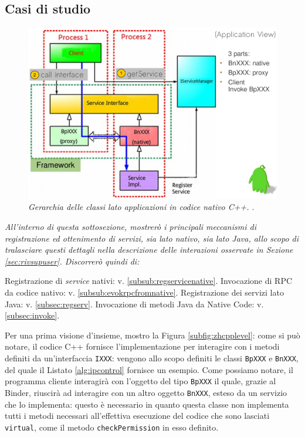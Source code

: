 \subsection{Casi di studio}
\begin{figure}[thp]
\centering
\includegraphics[scale=0.43]{img/korea/cpplevel.png}
\caption{\textit{Gerarchia delle classi lato applicazioni in codice nativo C++. \parencite{slide:zhIPC}}.}
\label{subfig:zhcpplevel}
\end{figure}

\textit{All'interno di questa sottosezione, mostrerò i principali meccanismi di
registrazione ed ottenimento di servizi, sia lato nativo, sia lato Java, allo 
scopo di tralasciare questi dettagli nella descrizione delle interazioni
osservate in Sezione \vref{sec:rivsupuser}. Discorrerò quindi di:}
\begin{itemize}
\diam Registrazione di \textit{service} nativi: v. \vref{subsub:regservicenative}.
\diam Invocazione di RPC da codice nativo: v. \vref{subsub:evokrpcfromnative}.
\diam Registrazione dei servizi lato Java: v. \vref{subsec:regserv}.
\diam Invocazione di metodi Java da Native Code: v. \vref{subsec:invoke}.
\end{itemize}

Per una prima visione d'insieme, mostro la Figura \vref{subfig:zhcpplevel}: 
come si può notare, il codice C++
fornisce l'implementazione per interagire con i metodi definiti da un'interfaccia
\texttt{\small IXXX}: vengono allo scopo definiti le classi \texttt{\small BpXXX} e 
\texttt{\small BnXXX}, del quale il Listato \vref{alg:ipcontrol} fornisce un esempio.
Come possiamo notare, il programma cliente interagirà con l'oggetto del tipo
\texttt{\small BpXXX} il quale, grazie al Binder, riuscirà ad interagire con un 
altro oggetto \texttt{\small BnXXX}, esteso da un servizio che lo implementa: questo
è necessario in quanto questa classe non implementa tutti i 
metodi necessari all'effettiva esecuzione del codice che sono lasciati \texttt{\small virtual},
come il metodo \texttt{\small checkPermission} in esso definito. 

